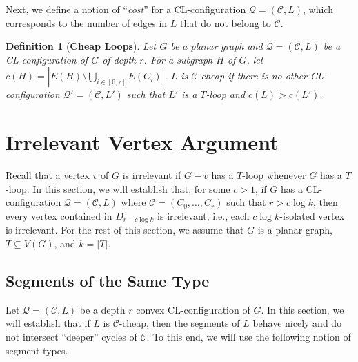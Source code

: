 \documentclass{article}
\newtheorem{definition}[theorem]{Definition}
\numberwithin{claimcounter}{lemma}
\begin{document}
Next, we define a notion of ``\textit{cost}'' for a CL-configuration $\mathcal{Q}= (\mathcal{C},L)$, which corresponds to the number of edges in $L$ that do not belong to $\mathcal{C}$.
\begin{definition}[{\bf Cheap Loops}]\label{D:CheapLoop}
Let $G$ be a planar graph and $\mathcal{Q}= (\mathcal{C},L)$ be a CL-configuration of $G$ of depth $r$. For a subgraph $H$ of $G$, let $c(H) = |E(H)\setminus \bigcup_{i\in [0,r]} E(C_i)|$.
$L$ is {\em $\mathcal{C}$-cheap} if there is no other CL-configuration $\mathcal{Q}'=(\mathcal{C},L')$ such that $L'$ is a $T$-loop and $c(L) >c(L')$. 
\end{definition}






\section{Irrelevant Vertex Argument}
Recall that a vertex $v$ of $G$ is irrelevant if $G-v$ has a $T$-loop whenever $G$ has a $T$-loop. In this section, we will establish that, for some $c>1$, if $G$ has a CL-configuration $\mathcal{Q}=(\mathcal{C},L)$ where $\mathcal{C} = (C_0,\ldots,C_r)$ such that $r>c \log k$, then every vertex contained in $D_{r-c\log k}$ is irrelevant, i.e., each $c\log k$-isolated vertex is irrelevant. For the rest of this section, we assume that $G$ is a planar graph, $T\subseteq V(G)$, and $k=|T|$. 




\subsection{Segments of the Same Type}\label{S:same}
Let $\mathcal{Q}=(\mathcal{C},L)$ be a depth $r$ convex CL-configuration of $G$. In this section, we will establish that if $L$ is $\mathcal{C}$-cheap, then the segments of $L$ behave nicely and do not intersect ``deeper'' cycles of $\mathcal{C}$. To this end, we will use the following notion of segment types.
\end{document}
